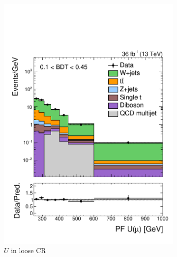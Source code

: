 \begin{figure}[]
    \begin{center}
        \begin{subfigure}[t]{0.32\textwidth}
            \includegraphics[width=\textwidth]{figures/monotop/prefit/singlemuonw_loose_pfUWmag_logy.pdf}
            \caption{$U$ in loose CR}
        \end{subfigure}
        \begin{subfigure}[t]{0.32\textwidth}

\end{subfigure}
\end{center}
\end{figure}
